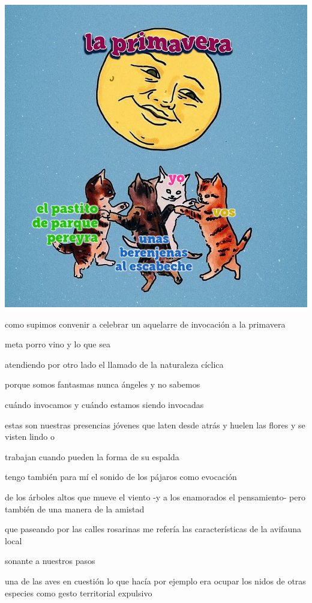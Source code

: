 \documentclass[
]{book}
\begin{document}
\includegraphics{images/15.png}

como supimos convenir a celebrar un aquelarre de invocación a la primavera

meta porro vino y lo que sea

atendiendo por otro lado el llamado de la naturaleza cíclica

porque somos fantasmas nunca ángeles y no sabemos

cuándo invocamos y cuándo estamos siendo invocadas

estas son nuestras presencias jóvenes que laten desde atrás y huelen las flores y se visten lindo o

trabajan cuando pueden la forma de su espalda

tengo también para mí el sonido de los pájaros como evocación

de los árboles altos que mueve el viento -y a los enamorados el pensamiento- pero también de una manera de la amistad

que paseando por las calles rosarinas me refería las características de la avifauna local

sonante a nuestros pasos

una de las aves en cuestión lo que hacía por ejemplo era ocupar los nidos de otras especies como gesto territorial expulsivo
\end{document}
